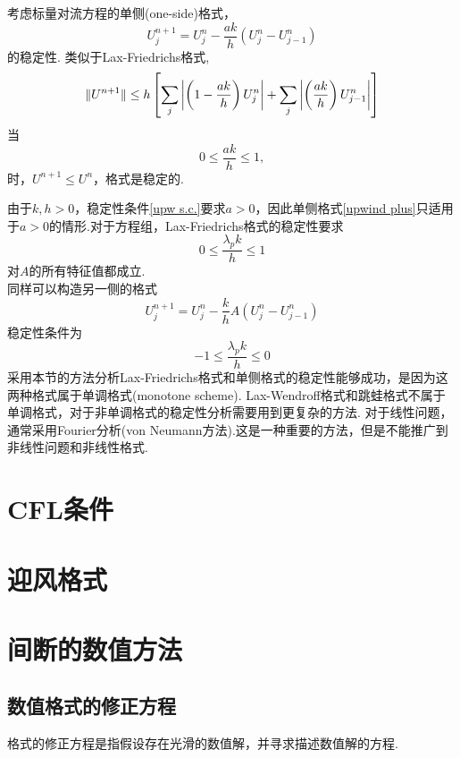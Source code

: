 \begin{myexample}
	考虑标量对流方程的单侧(one-side)格式，
	\begin{equation} \label{upwind plus}
		U_j^{n+1} = U_j^n - \frac{ak}{h}(U_j^n - U_{j-1}^n)
	\end{equation}
	的稳定性.
	类似于Lax-Friedrichs格式,
	\begin{equation}
		\lVert U^{n+1}\rVert \le h \left[ \sum_j    \left| \left( 1-\frac{ak}{h}\right)U_j^n \right|  + \sum_j \left| \left( \frac{ak}{h}\right)U_{j-1}^n \right|  \right]
	\end{equation}
	当
	\begin{equation}\label{upw s.c.}
		0 \le \frac{ak}{h} \le 1,
	\end{equation}
	时，$U^{n+1}\le U^n$，格式是稳定的.
\end{myexample}
由于$k,h >0$，稳定性条件\eqref{upw s.c.}要求$a>0$，因此单侧格式\eqref{upwind plus}只适用于$a>0$的情形.对于方程组，Lax-Friedrichs格式的稳定性要求
	\begin{equation}
    	 0 \le \frac{\lambda_p k}{h}   \le 1
	\end{equation}
对$A$的所有特征值都成立.\\
同样可以构造另一侧的格式
	\begin{equation} 
		U_j^{n+1} = U_j^n - \frac{k}{h}A(U_j^n - U_{j-1}^n)
	\end{equation}
稳定性条件为
	\begin{equation}
	-1 \le \frac{\lambda_p k}{h}   \le 0
	\end{equation}
	采用本节的方法分析Lax-Friedrichs格式和单侧格式的稳定性能够成功，是因为这两种格式属于单调格式(monotone scheme). Lax-Wendroff格式和跳蛙格式不属于单调格式，对于非单调格式的稳定性分析需要用到更复杂的方法. 对于线性问题，通常采用Fourier分析(von Neumann方法).这是一种重要的方法，但是不能推广到非线性问题和非线性格式.
	
\section{CFL条件}

\section{迎风格式}

\section{间断的数值方法}

\subsection{数值格式的修正方程}
	格式的修正方程是指假设存在光滑的数值解，并寻求描述数值解的方程.

